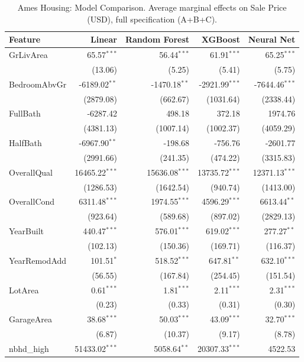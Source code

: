 \begin{table}[htbp]
\centering
\small
\begin{threeparttable}
\caption{Ames Housing: Model Comparison. Average marginal effects on Sale Price (USD), full specification (A+B+C).}
\label{tab:ames_housing_model_comparison}
\begin{tabular}{lrrrr}
\toprule
Feature & Linear & Random Forest & XGBoost & Neural Net \\
\midrule
GrLivArea & 65.57$^{***}$ & 56.44$^{***}$ & 61.91$^{***}$ & 65.25$^{***}$ \\
 & (13.06) & (5.25) & (5.41) & (5.75) \\
BedroomAbvGr & -6189.02$^{**}$ & -1470.18$^{**}$ & -2921.99$^{***}$ & -7644.46$^{***}$ \\
 & (2879.08) & (662.67) & (1031.64) & (2338.44) \\
FullBath & -6287.42 & 498.18 & 372.18 & 1974.76 \\
 & (4381.13) & (1007.14) & (1002.37) & (4059.29) \\
HalfBath & -6967.90$^{**}$ & -198.68 & -756.76 & -2601.77 \\
 & (2991.66) & (241.35) & (474.22) & (3315.83) \\
\midrule
OverallQual & 16465.22$^{***}$ & 15636.08$^{***}$ & 13735.72$^{***}$ & 12371.13$^{***}$ \\
 & (1286.53) & (1642.54) & (940.74) & (1413.00) \\
OverallCond & 6311.48$^{***}$ & 1974.55$^{***}$ & 4596.29$^{***}$ & 6613.44$^{**}$ \\
 & (923.64) & (589.68) & (897.02) & (2829.13) \\
YearBuilt & 440.47$^{***}$ & 576.01$^{***}$ & 619.02$^{***}$ & 277.27$^{**}$ \\
 & (102.13) & (150.36) & (169.71) & (116.37) \\
YearRemodAdd & 101.51$^{*}$ & 518.52$^{***}$ & 647.81$^{**}$ & 632.10$^{***}$ \\
 & (56.55) & (167.84) & (254.45) & (151.54) \\
\midrule
LotArea & 0.61$^{***}$ & 1.81$^{***}$ & 2.11$^{***}$ & 2.31$^{***}$ \\
 & (0.23) & (0.33) & (0.31) & (0.30) \\
GarageArea & 38.68$^{***}$ & 50.03$^{***}$ & 43.09$^{***}$ & 32.70$^{***}$ \\
 & (6.87) & (10.37) & (9.17) & (8.78) \\
nbhd\_high & 51433.02$^{***}$ & 5058.64$^{**}$ & 20307.33$^{***}$ & 4522.53 \\

\end{tabular}
\end{threeparttable}
\end{table}
